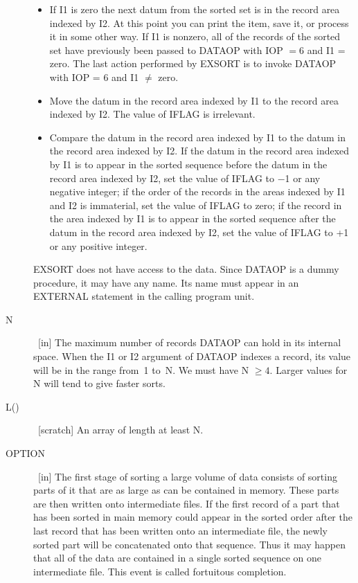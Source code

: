 \documentclass[twoside]{MATH77}
\begin{document}
\begin{description}
\begin{itemize}
\item[6\ ] If I1 is zero the next datum from the sorted set is in the
record area indexed by I2.  At this point you can print the item, save it,
or process it in some other way.  If I1 is nonzero, all of the records of
the sorted set have previously been passed to DATAOP with IOP $= 6$ and I1
= zero.  The last action performed by EXSORT is to invoke DATAOP with IOP
= 6 and I1 $\neq $ zero.

\item[7\ ] Move the datum in the record area indexed by I1 to the record area indexed
by I2. The value of IFLAG is irrelevant.

\item[8\ ] Compare the datum in the record area indexed by I1 to the datum in the
record area indexed by I2. If the datum in the record area indexed by I1 is
to appear in the sorted sequence before the datum in the record area indexed
by I2, set the value of IFLAG to $-$1 or any negative integer; if the order of the
records in the areas indexed by I1 and I2 is immaterial, set the value of
IFLAG to zero; if the record in the area indexed by I1 is to appear in the
sorted sequence after the datum in the record area indexed by I2, set the
value of IFLAG to +1 or any positive integer.
\end{itemize}
EXSORT does not have access to the data.  Since DATAOP is a dummy
procedure, it may have any name.  Its name must appear in an EXTERNAL
statement in the calling program unit.
\item[N] \ [in] The maximum number of records DATAOP can hold in its internal
space. When the I1 or I2 argument of DATAOP indexes a record, its value will
be in the range from~1 to~N. We must have N $\geq 4.$  Larger values
for N will tend to give faster sorts.

\item[L()] \ [scratch] An array of length at least N.

\item[OPTION] \ [in] The first stage of sorting a large volume of data consists of
sorting parts of it that are as large as can be contained in memory. These
parts are then written onto intermediate files. If the first record of a
part that has been sorted in main memory could appear in the sorted order
after the last record that has been written onto an intermediate file, the
newly sorted part will be concatenated onto that sequence. Thus it may
happen that all of the data are contained in a single sorted sequence on one
intermediate file. This event is called fortuitous completion.


\end{description}
\end{document}
